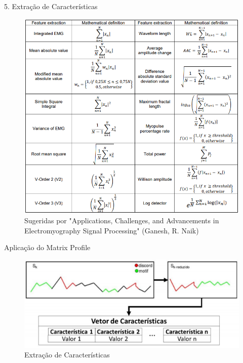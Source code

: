 \documentclass[apesctratio=169]{beamer}
\begin{document}
	\begin{frame}{5. Extração de Características}
	    
      \begin{figure}[H]
        \includegraphics[scale=0.3]{feat.PNG}
        \caption{Sugeridas por "Applications, Challenges, and Advancements in Electromyography Signal Processing" (Ganesh, R. Naik)}
      \end{figure}
      
	\end{frame}
	
	\begin{frame}{Aplicação do Matrix Profile}
        \begin{figure}[htb]
			     \includegraphics[scale=0.5]{etapa5.PNG}
			     \caption{Extração de Características}
		\end{figure}
	\end{frame}
	
\end{document}
